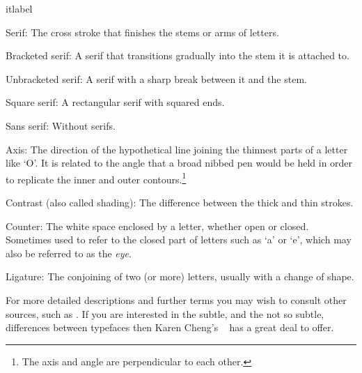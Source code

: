\documentclass[10pt,letterpaper,extrafontsizes]{memoir}
\begin{document}
\begin{labelled}{itlabel}
\item[Serif:] The cross stroke that finishes the stems or arms of letters.
\item[Bracketed serif:] A serif that transitions gradually into 
     the stem it is attached to.
\item[Unbracketed serif:] A serif with a sharp break between 
      it and the stem.
\item[Square serif:] A rectangular serif with squared ends.
\item[Sans serif:] Without serifs.
\item[Axis:] The direction of the hypothetical line joining the thinnest 
             parts of a letter like `O'. It is related to the angle that
             a broad nibbed pen would be held in order to replicate the
             inner and outer contours.\footnote{The axis and angle are 
             perpendicular to each other.}
\item[Contrast (also called shading):] The 
              difference between the thick and thin strokes.
\item[Counter:] The white space enclosed by a letter, 
                whether open or closed.
                Sometimes used to refer to the closed part of letters such
                as `a' or `e', which may also be referred to as the 
               \textit{eye}.
\item[Ligature:] The conjoining of two (or more) letters, 
                 usually with a change of shape.
\end{labelled}


For more detailed descriptions and further terms
you may wish to consult other sources, such as 
\autocite{BRINGHURST99,LAWSONAGNER90,MEGGS00}. If you are interested in the
subtle, and the not so subtle, differences between typefaces then Karen 
Cheng's ~\autocite{CHENG05} has a great deal to offer.
\end{document}
